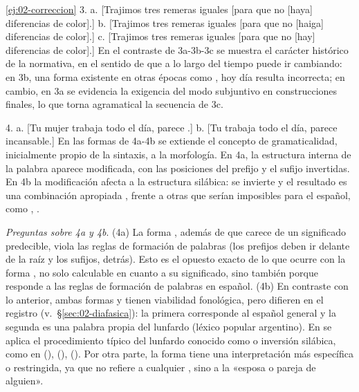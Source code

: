 \begin{solucion}{\ref{ej:02-correccion}}
3. a. [Trajimos tres remeras iguales [para que no [haya] diferencias de
color].] b. [Trajimos tres remeras iguales [para que no [haiga] diferencias de
color].] c. [Trajimos tres remeras iguales [para que no [hay] diferencias de
color].] En el contraste de 3a-3b-3c se muestra el carácter histórico de la
normativa, en el sentido de que a lo largo del tiempo puede ir cambiando: en
3b, una forma existente en otras épocas como , hoy día resulta
incorrecta; en cambio, en 3a se evidencia la exigencia del modo subjuntivo en
construcciones finales, lo que torna agramatical la secuencia de 3c.

4. a. [Tu mujer trabaja todo el día, parece .]
b. [Tu  trabaja todo el día, parece incansable.] En las formas de
4a-4b se extiende el concepto de gramaticalidad, inicialmente propio de la
sintaxis, a la morfología. En 4a, la estructura interna de la palabra
 aparece modificada, con las posiciones del prefijo y el
sufijo invertidas. En 4b la modificación afecta a la estructura silábica:
 se invierte y el resultado es una combinación apropiada
, frente a otras que serían imposibles para el español, como
, .

\textit{Preguntas sobre 4a y 4b}. (4a) La forma
, además de que carece de un significado
predecible, viola las reglas de formación de palabras (los prefijos deben ir
delante de la raíz y los sufijos, detrás). Esto es el opuesto exacto de lo que
ocurre con la forma , no solo calculable en cuanto a su
significado, sino también porque responde a las reglas de formación de palabras
en español. (4b) En contraste con lo anterior, ambas formas  y
 tienen viabilidad fonológica, pero difieren en el registro
(v.~§\ref{sec:02-diafasica}): la primera corresponde al español general y la segunda es una
palabra propia del lunfardo (léxico popular argentino). En  se
aplica el procedimiento típico del lunfardo conocido como  o
inversión silábica, como en  (), 
(),  (). Por otra parte, la forma
 tiene una interpretación más específica o restringida, ya que no
refiere a cualquier , sino a la «esposa o pareja de alguien».
\end{solucion}

